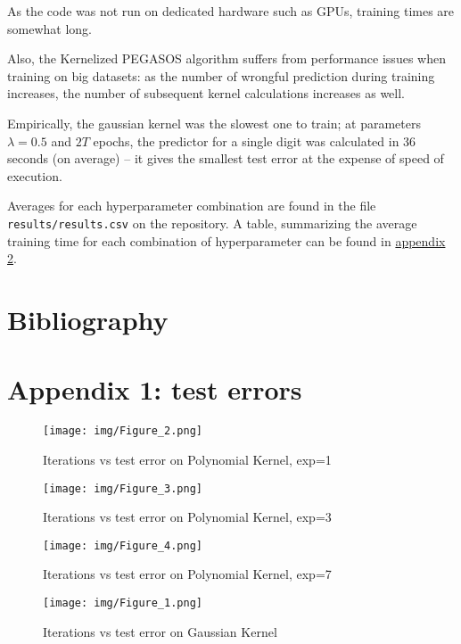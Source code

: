 \documentclass[a4paper]{article}
\begin{document}
As the code was not run on dedicated hardware such as GPUs, training times are somewhat long.

Also, the Kernelized PEGASOS algorithm suffers from performance issues when training on big datasets: as the number of wrongful prediction during training increases, the number of subsequent kernel calculations increases as well.

Empirically, the gaussian kernel was the slowest one to train; at parameters \(\lambda=0.5\) and \(2T\) epochs, the predictor for a single digit was calculated in 36 seconds (on average) -- it gives the smallest test error at the expense of speed of execution.  

Averages for each hyperparameter combination are found in the file \texttt{results/results.csv} on the repository. A table, summarizing the average training time for each combination of hyperparameter can be found in \hyperref[org4d67df6]{appendix 2}.

\section{Bibliography}
\label{sec:orga0669c2}

 



\newpage

\section{Appendix 1: test errors}
\label{sec:org70d414e}
\label{org20e0d68}

\begin{figure}[htbp]
\centering
\texttt{[image: img/Figure\_2.png]}
\caption[Short caption]{Iterations vs test error on Polynomial Kernel, exp=1}
\end{figure}

\begin{figure}[htbp]
\centering
\texttt{[image: img/Figure\_3.png]}
\caption[Short caption]{Iterations vs test error on Polynomial Kernel, exp=3}
\end{figure}

\begin{figure}[htbp]
\centering
\texttt{[image: img/Figure\_4.png]}
\caption[Short caption]{Iterations vs test error on Polynomial Kernel, exp=7}
\end{figure}

\begin{figure}[htbp]
\centering
\texttt{[image: img/Figure\_1.png]}
\caption[Short caption]{Iterations vs test error on Gaussian Kernel}
\end{figure}
\end{document}
